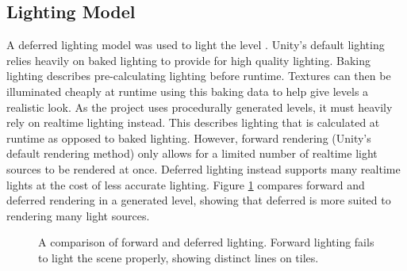 \subsection{Lighting Model}
A deferred lighting model was used to light the level \cite{lighting_models}. Unity's default lighting relies heavily on baked lighting to provide for high quality lighting. Baking lighting describes pre-calculating lighting before runtime. Textures can then be illuminated cheaply at runtime using this baking data to help give levels a realistic look. As the project uses procedurally generated levels, it must heavily rely on realtime lighting instead. This describes lighting that is calculated at runtime as opposed to baked lighting. However, forward rendering (Unity's default rendering method) only allows for a limited number of realtime light sources to be rendered at once. Deferred lighting instead supports many realtime lights at the cost of less accurate lighting. Figure \ref{fig:renderingModels} compares forward and deferred rendering in a generated level, showing that deferred is more suited to rendering many light sources.

\begin{figure}[H]
    \centering
    \hfill
    \caption{A comparison of forward and deferred lighting. Forward lighting fails to light the scene properly, showing distinct lines on tiles.}
    \label{fig:renderingModels}
\end{figure}

